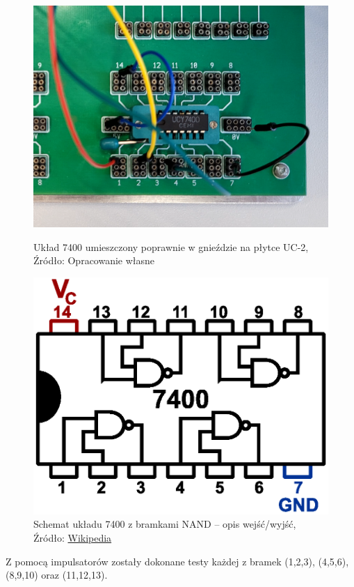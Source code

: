 \documentclass{article}
\begin{document}
        \begin{figure}[!ht]
          \begin{minipage}{.5\textwidth}
            \centering
            \includegraphics[scale=0.12]{grafiki/7400_zdj.png}
            \caption{Układ 7400 umieszczony poprawnie w gnieździe na płytce UC-2,
            \\Źródło: Opracowanie własne}
          \end{minipage}
          \begin{minipage}{.5\textwidth}
            \centering
            \includegraphics[scale=0.43]{grafiki/TTL_NAND_7400.eps}
            \caption{Schemat układu 7400 z bramkami NAND -- opis wejść/wyjść,
            \\Źródło: \href{https://commons.wikimedia.org/wiki/File:Ttl_inside_7400.svg}{Wikipedia}}
          \end{minipage}
        \end{figure}
       Z pomocą impulsatorów zostały dokonane testy każdej z bramek (1,2,3), (4,5,6), (8,9,10) oraz (11,12,13).
\end{document}
